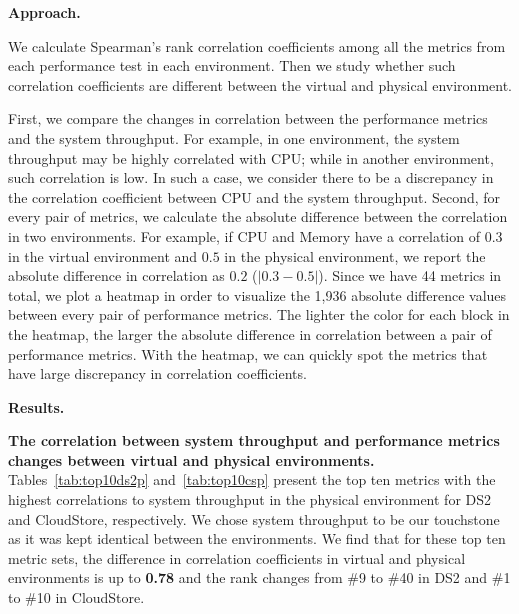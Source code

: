 \noindent \textbf{Approach.} 

We calculate Spearman's rank correlation coefficients among all the metrics from each performance test in each environment. Then we study whether such correlation coefficients are different between the virtual and physical environment. 

First, we compare the changes in correlation between the performance metrics and the system throughput. For example, in one environment, the system throughput may be highly correlated with CPU; while in another environment, such correlation is low. In such a case, we consider there to be a discrepancy in the correlation coefficient between CPU and the system throughput. Second, for every pair of metrics, we calculate the absolute difference between the correlation in two environments. For example, if CPU and Memory have a correlation of $0.3$ in the virtual environment and $0.5$ in the physical environment, we report the absolute difference in correlation as $0.2$ ($|0.3-0.5|$). Since we have 44 metrics in total, we plot a heatmap in order to visualize the 1,936 absolute difference values between every pair of performance metrics. The lighter the color for each block in the heatmap, the larger the absolute difference in correlation between a pair of performance metrics. With the heatmap, we can quickly spot the metrics that have large discrepancy in correlation coefficients. 


\noindent \textbf{Results.}



\noindent \textbf{The correlation between system throughput and performance metrics changes between virtual and physical environments.} Tables~\ref{tab:top10ds2p} and~\ref{tab:top10csp} present the top ten metrics with the highest correlations to system throughput in the physical environment for DS2 and CloudStore, respectively. We chose system throughput to be our touchstone as it was kept identical between the environments.  We find that for these top ten metric sets, the difference in correlation coefficients in virtual and physical environments is up to \textbf{0.78} and the rank changes from \#9 to \#40 in DS2 and \#1 to \#10 in CloudStore.

